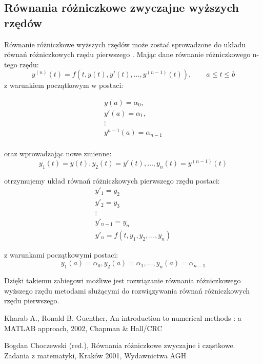 \subsection*{Równania różniczkowe zwyczajne wyższych rzędów}
Równanie różniczkowe wyższych rzędów może zostać sprowadzone do układu równań różniczkowych rzędu pierwszego \cite[str. 293]{AK_RBG2002}. Mając dane równanie różniczkowego n-tego rzędu:
$$y^{(n)}(t) = f(t,y(t),y'(t),\hdots,y^{(n-1)}(t)), \qquad a \leq t \leq b$$
z warunkiem początkowym w postaci:

$$\begin{array}{c}
y(a)       = \alpha_0,    \\
y'(a)      = \alpha_1,    \\
\vdots					  \\
y^{n-1}(a) = \alpha_{n-1} \\
\end{array}$$

oraz wprowadzając nowe zmienne:
$$y_1(t) = y(t), y_2(t) = y'(t), \hdots, y_n(t) = y^{(n-1)}(t)$$

otrzymujemy układ równań różniczkowych pierwszego rzędu postaci:
$$\begin{array}{l}
y'_1       = y_2   \\
y'_2       = y_3   \\
\vdots			   \\
y'_{n-1} = y_n     \\
y'_n = f(t,y_1,y_2,\hdots,y_n)
\end{array}$$

z warunkami początkowymi postaci:
$$y_1(a) = \alpha_0, y_2(a) = \alpha_1, \hdots, y_n(a) = \alpha_{n-1}$$

Dzięki takiemu zabiegowi możliwe jest rozwiązanie równania różniczkowego wyższego rzędu metodami służącymi do rozwiązywania równań różniczkowych rzędu pierwszego.

\newpage

\begin{thebibliography}{widest-label}
Kharab A., Ronald B. Guenther, An introduction to numerical methods : a MATLAB approach, 2002, Chapman \& Hall/CRC

Bogdan Choczewski (red.), Równania różniczkowe zwyczajne i cząstkowe. Zadania z matematyki, Kraków 2001, Wydawnictwa AGH
\end{thebibliography}




